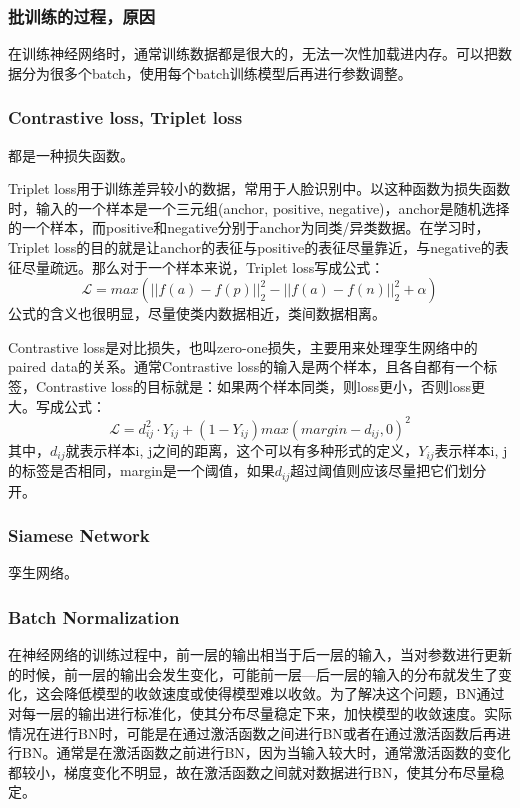 \subsubsection{批训练的过程，原因}
在训练神经网络时，通常训练数据都是很大的，无法一次性加载进内存。可以把数据分为很多个batch，使用每个batch训练模型后再进行参数调整。

\subsubsection{Contrastive loss, Triplet loss} 
都是一种损失函数。

Triplet loss用于训练差异较小的数据，常用于人脸识别中。以这种函数为损失函数时，输入的一个样本是一个三元组(anchor, positive, negative)，anchor是随机选择的一个样本，而positive和negative分别于anchor为同类/异类数据。在学习时，Triplet loss的目的就是让anchor的表征与positive的表征尽量靠近，与negative的表征尽量疏远。那么对于一个样本来说，Triplet loss写成公式： $$\mathcal{L} = max( ||f(a)-f(p)||_2^2 - ||f(a) - f(n)||_2^2 + \alpha )
$$
公式的含义也很明显，尽量使类内数据相近，类间数据相离。

Contrastive loss是对比损失，也叫zero-one损失，主要用来处理孪生网络中的paired data的关系。通常Contrastive loss的输入是两个样本，且各自都有一个标签，Contrastive loss的目标就是：如果两个样本同类，则loss更小，否则loss更大。写成公式：
$$
\mathcal{L} = d_{ij}^2 \cdot Y_{ij} + (1 - Y_{ij} )max(margin - d_{ij}, 0)^2
$$
其中，$d_{ij}$就表示样本i, j之间的距离，这个可以有多种形式的定义，$Y_{ij}$表示样本i, j的标签是否相同，margin是一个阈值，如果$d_{ij}$超过阈值则应该尽量把它们划分开。

\subsubsection{Siamese Network}
孪生网络。


\subsubsection{Batch Normalization}
在神经网络的训练过程中，前一层的输出相当于后一层的输入，当对参数进行更新的时候，前一层的输出会发生变化，可能前一层---后一层的输入的分布就发生了变化，这会降低模型的收敛速度或使得模型难以收敛。为了解决这个问题，BN通过对每一层的输出进行标准化，使其分布尽量稳定下来，加快模型的收敛速度。实际情况在进行BN时，可能是在通过激活函数之间进行BN或者在通过激活函数后再进行BN。通常是在激活函数之前进行BN，因为当输入较大时，通常激活函数的变化都较小，梯度变化不明显，故在激活函数之间就对数据进行BN，使其分布尽量稳定。



